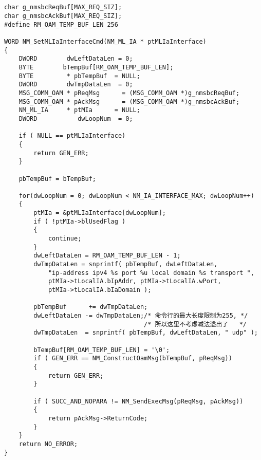 ﻿\documentclass  [11pt,twocolumn]{article}
\begin{document}
\subsection{}

\begin{lstlisting}
char g_nmsbcReqBuf[MAX_REQ_SIZ];
char g_nmsbcAckBuf[MAX_REQ_SIZ];
#define RM_OAM_TEMP_BUF_LEN 256

WORD NM_SetMLIaInterfaceCmd(NM_ML_IA * ptMLIaInterface)
{
    DWORD        dwLeftDataLen = 0;
    BYTE        bTempBuf[RM_OAM_TEMP_BUF_LEN];
    BYTE         * pbTempBuf  = NULL;
    DWORD        dwTmpDataLen  = 0;
    MSG_COMM_OAM * pReqMsg      = (MSG_COMM_OAM *)g_nmsbcReqBuf;
    MSG_COMM_OAM * pAckMsg      = (MSG_COMM_OAM *)g_nmsbcAckBuf;
    NM_ML_IA     * ptMIa      = NULL;
    DWORD           dwLoopNum  = 0;

    if ( NULL == ptMLIaInterface)
    {
        return GEN_ERR;
    }

    pbTempBuf = bTempBuf;

    for(dwLoopNum = 0; dwLoopNum < NM_IA_INTERFACE_MAX; dwLoopNum++)
    {
        ptMIa = &ptMLIaInterface[dwLoopNum];
        if ( !ptMIa->blUsedFlag )
        {
            continue;
        }
        dwLeftDataLen = RM_OAM_TEMP_BUF_LEN - 1;
        dwTmpDataLen = snprintf( pbTempBuf, dwLeftDataLen,
            "ip-address ipv4 %s port %u local domain %s transport ",
            ptMIa->tLocalIA.bIpAddr, ptMIa->tLocalIA.wPort,
            ptMIa->tLocalIA.bIaDomain );
 
        pbTempBuf      += dwTmpDataLen;
        dwLeftDataLen -= dwTmpDataLen;/* 命令行的最大长度限制为255, */
                                      /* 所以这里不考虑减法溢出了   */
        dwTmpDataLen  = snprintf( pbTempBuf, dwLeftDataLen, " udp" );

        bTempBuf[RM_OAM_TEMP_BUF_LEN] = '\0';                
        if ( GEN_ERR == NM_ConstructOamMsg(bTempBuf, pReqMsg))
        {
            return GEN_ERR;
        }

        if ( SUCC_AND_NOPARA != NM_SendExecMsg(pReqMsg, pAckMsg))
        {
            return pAckMsg->ReturnCode;
        }
    }
    return NO_ERROR;
}
\end{lstlisting}

\subsection{}
\end{document}
